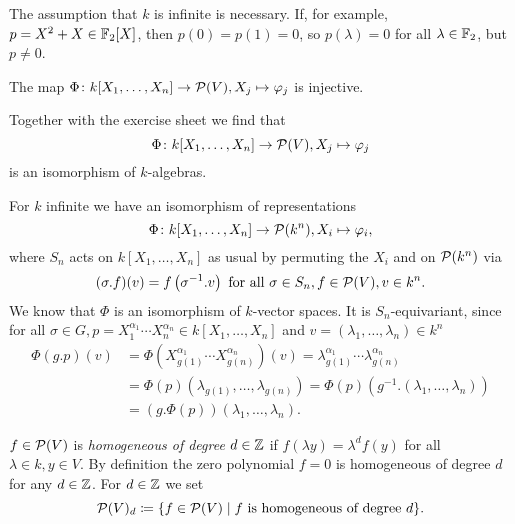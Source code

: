 \begin{warn}
  The assumption that $k$ is infinite is necessary.
  If, for example, $p = X^2 + X \in \mathbb{F}_2[X]$, then $p(0) = p(1) = 0$, so $p(\lambda) = 0$ for all $\lambda \in \mathbb{F}_2$, but $p \neq 0$.
\end{warn}


\begin{cor}
  The map $\Phi \colon k[X_1, \dotsc, X_n] \to \mathcal{P}(V), X_j \mapsto \varphi_j$ is injective.
\end{cor}


Together with the exercise sheet we find that
\[
          \Phi
  \colon  k[X_1, \dotsc, X_n]
  \to     \mathcal{P}(V),
          X_j
  \mapsto \varphi_j
\]
is an isomorphism of $k$-algebras.


\begin{rem}
  For $k$ infinite we have an isomorphism of representations
  \[
            \Phi
    \colon  k[X_1, \dotsc, X_n]
    \to     \mathcal{P}(k^n),
            X_i
    \mapsto \varphi_i,
  \]
  where $S_n$ acts on $k[X_1, \dotsc, X_n]$ as usual by permuting the $X_i$ and on $\mathcal{P}(k^n)$ via
  \[
      (\sigma.f)(v)
    = f\left( \sigma^{-1}.v \right)
    \text{ for all }
    \sigma \in S_n,
    f \in \mathcal{P}(V),
    v \in k^n.
  \]
  We know that $\Phi$ is an isomorphism of $k$-vector spaces.
  It is $S_n$-equivariant, since for all $\sigma \in G, p = X_1^{\alpha_1} \dotsm X_n^{\alpha_n} \in k[X_1, \dotsc, X_n]$ and $v = (\lambda_1, \dotsc, \lambda_n) \in k^n$
  \begin{align*}
       \Phi(g.p)(v)
    &= \Phi\left( X_{g(1)}^{\alpha_1} \dotsm X_{g(n)}^{\alpha_n} \right)(v)
     = \lambda_{g(1)}^{\alpha_1} \dotsm \lambda_{g(n)}^{\alpha_n} \\
    &= \Phi(p)( \lambda_{g(1)}, \dotsc, \lambda_{g(n)} )
     = \Phi(p)\left( g^{-1}.(\lambda_1, \dotsc, \lambda_n) \right) \\
    &= (g.\Phi(p))(\lambda_1, \dotsc, \lambda_n).
  \end{align*}
\end{rem}


\begin{defi}
  $f \in \mathcal{P}(V)$ is \emph{homogeneous of degree $d \in \mathbb{Z}$} if $f(\lambda y) = \lambda^d f(y)$ for all $\lambda \in k, y \in V$.
  By definition the zero polynomial $f=0$ is homogeneous of degree $d$ for any $d \in \mathbb{Z}$.
  For $d \in \mathbb{Z}$ we set
  \[
              \mathcal{P}(V)_d
    \coloneqq \{
                f \in \mathcal{P}(V)
              \mid
                f \text{ is homogeneous of degree } d
              \}.
  \]
\end{defi}


